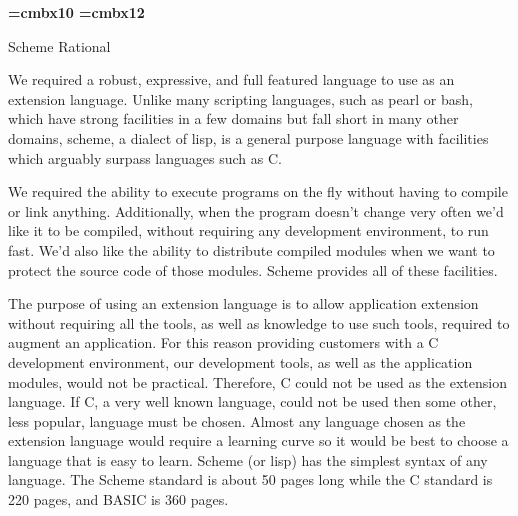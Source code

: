 \nopagenumbers

\font\bf=cmbx10
\font\header=cmbx12

\def\section#1{\bigskip  \leftline{\bf #1.} \medskip}

\centerline{\header Scheme Rational}
\bigskip

\section{Language power}

We required a robust, expressive, and full featured language to use as
an extension language.  Unlike many scripting languages, such as pearl
or bash, which have strong facilities in a few domains but fall short
in many other domains, scheme, a dialect of lisp, is a general purpose
language with facilities which arguably surpass languages such as C.

We required the ability to execute programs on the fly without having
to compile or link anything.  Additionally, when the program doesn't
change very often we'd like it to be compiled, without requiring any
development environment, to run fast.  We'd also like the ability to
distribute compiled modules when we want to protect the source code of
those modules.  Scheme provides all of these facilities.


\section{Ease of language}

The purpose of using an extension language is to allow application
extension without requiring all the tools, as well as knowledge to use
such tools, required to augment an application.  For this reason
providing customers with a C development environment, our development
tools, as well as the application modules, would not be practical.
Therefore, C could not be used as the extension language.  If C, a
very well known language, could not be used then some other, less
popular, language must be chosen.  Almost any language chosen as the
extension language would require a learning curve so it would be best
to choose a language that is easy to learn.  Scheme (or lisp) has the
simplest syntax of any language.  The Scheme standard is about 50
pages long while the C standard is 220 pages, and BASIC is 360 pages.


